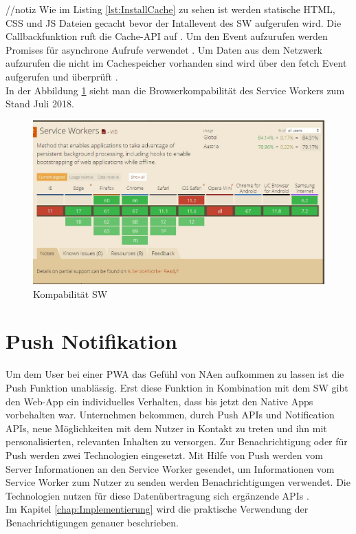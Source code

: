 //notiz
Wie im Listing \ref{lst:InstallCache}  zu  sehen ist werden statische HTML, CSS und JS Dateien gecacht bevor der Intallevent des \acs{SW} aufgerufen wird. Die Callbackfunktion ruft die Cache-API auf \cite{CacheAPI}.
Um den Event aufzurufen werden Promises für asynchrone Aufrufe verwendet .
Um Daten aus dem Netzwerk aufzurufen die nicht im Cachespeicher vorhanden sind wird über den fetch Event aufgerufen und überprüft \cite{Promises}.
\\
In der Abbildung \ref{fig:BrowserSW} sieht man die Browserkompabilität des Service Workers zum Stand Juli 2018.




\begin{figure}[h]
	\centering
	\includegraphics[width=14cm]{BilderAllgemein/BrowserSW}\medskip
	\caption{Kompabilität \acl{SW} \cite{BrowserSupport}}
	\label{fig:BrowserSW}
\end{figure}


\section{Push Notifikation}
Um dem User bei einer \acs{PWA} das Gefühl von \acl{NA}en aufkommen zu lassen ist die Push Funktion unablässig. Erst diese Funktion in Kombination mit dem \acs{SW} gibt den \acl{Web-App} ein individuelles Verhalten, dass bis jetzt den Native Apps vorbehalten war.
Unternehmen bekommen, durch Push APIs und Notification APIs, neue Möglichkeiten mit dem Nutzer in Kontakt zu treten und ihn mit personalisierten, relevanten Inhalten zu versorgen.
Zur Benachrichtigung oder für Push werden zwei Technologien eingesetzt. Mit Hilfe von Push werden vom Server Informationen an den Service Worker gesendet, um Informationen vom Service Worker zum Nutzer zu senden werden Benachrichtigungen verwendet. Die Technologien nutzen für diese Datenübertragung sich ergänzende APIs \cite{PushNotifikation}. \\
Im Kapitel \ref{chap:Implementierung} wird die praktische Verwendung der Benachrichtigungen genauer beschrieben.  
 
